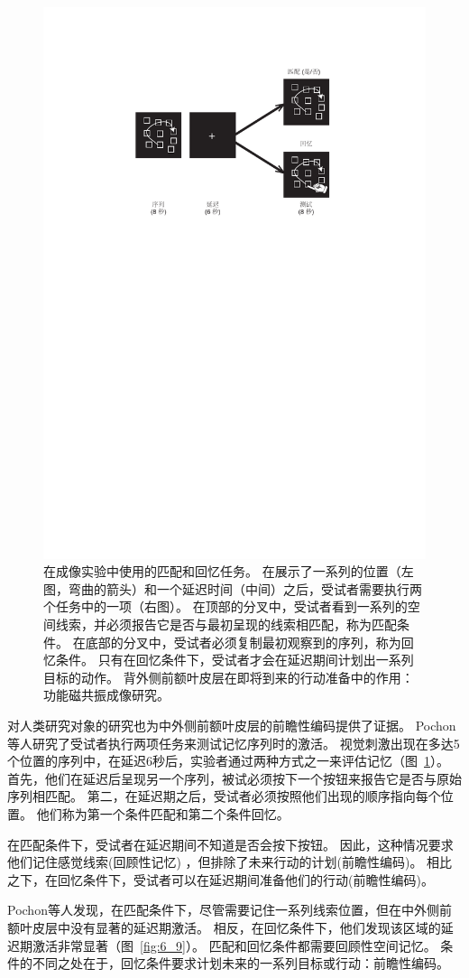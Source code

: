 \begin{figure}
	\centering
	\includegraphics[width=0.55\linewidth]{chap6/6_8}
	\caption{在成像实验中使用的匹配和回忆任务。
		在展示了一系列的位置（左图，弯曲的箭头）和一个延迟时间（中间）之后，受试者需要执行两个任务中的一项（右图）。
		在顶部的分叉中，受试者看到一系列的空间线索，并必须报告它是否与最初呈现的线索相匹配，称为匹配条件。
		在底部的分叉中，受试者必须复制最初观察到的序列，称为回忆条件。
		只有在回忆条件下，受试者才会在延迟期间计划出一系列目标的动作。
		背外侧前额叶皮层在即将到来的行动准备中的作用：功能磁共振成像研究\cite{pochon2001role}。}
	\label{fig:6_8}
\end{figure}


对人类研究对象的研究也为中外侧前额叶皮层的前瞻性编码提供了证据。
Pochon等人\cite{pochon2001role}研究了受试者执行两项任务来测试记忆序列时的激活。
视觉刺激出现在多达5个位置的序列中，在延迟6秒后，实验者通过两种方式之一来评估记忆（图~\ref{fig:6_8}）。
首先，他们在延迟后呈现另一个序列，被试必须按下一个按钮来报告它是否与原始序列相匹配。
第二，在延迟期之后，受试者必须按照他们出现的顺序指向每个位置。
他们称为第一个条件匹配和第二个条件回忆。


在匹配条件下，受试者在延迟期间不知道是否会按下按钮。
因此，这种情况要求他们记住感觉线索(回顾性记忆) ，但排除了未来行动的计划(前瞻性编码)。
相比之下，在回忆条件下，受试者可以在延迟期间准备他们的行动(前瞻性编码)。


Pochon等人发现，在匹配条件下，尽管需要记住一系列线索位置，但在中外侧前额叶皮层中没有显著的延迟期激活。
相反，在回忆条件下，他们发现该区域的延迟期激活非常显著（图~\ref{fig:6_9}）。
匹配和回忆条件都需要回顾性空间记忆。
条件的不同之处在于，回忆条件要求计划未来的一系列目标或行动：前瞻性编码。


